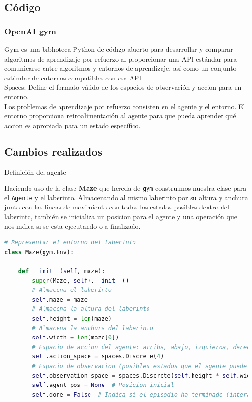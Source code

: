 \documentclass[a4paper,12pt]{article}
\begin{document}
\subsection{Código}

\subsubsection*{OpenAI gym}

Gym es una biblioteca Python de código abierto para desarrollar y comparar 
algoritmos de aprendizaje por refuerzo al proporcionar una API estándar 
para comunicarse entre algoritmos y entornos de aprendizaje, así como un 
conjunto estándar de entornos compatibles con esa API. \cite{docGym} \\

Spaces: Define el formato válido de los espacios de observación y accion para un entorno.\\

Los problemas de aprendizaje por refuerzo consisten en el agente y 
el entorno. El entorno proporciona retroalimentación al agente para 
que pueda aprender qué accion es apropiada para un estado específico.

\subsection{Cambios realizados}

\begin{center}
    \Large{Definición del agente}
\end{center}

\noindent Haciendo uso de la clase \textbf{Maze} que hereda de \texttt{gym} construimos 
nuestra clase para el \texttt{Agente} y el laberinto. Almacenando al mismo laberinto 
por su altura y anchura junto con las lineas de movimiento con todos los estados posibles 
dentro del laberinto, también se inicializa un posicion para el agente y una operación 
que nos indica si se esta ejecutando o a finalizado.

\begin{lstlisting}[style=mystylepython, language=Python, caption= Definición del agente]
# Representar el entorno del laberinto
class Maze(gym.Env):
    
    def __init__(self, maze):
        super(Maze, self).__init__()
        # Almacena el laberinto
        self.maze = maze  
        # Almacena la altura del laberinto
        self.height = len(maze)  
        # Almacena la anchura del laberinto
        self.width = len(maze[0])  
        # Espacio de accion del agente: arriba, abajo, izquierda, derecha
        self.action_space = spaces.Discrete(4)  
        # Espacio de observacion (posibles estados que el agente puede observar del entorno)
        self.observation_space = spaces.Discrete(self.height * self.width) 
        self.agent_pos = None  # Posicion inicial 
        self.done = False  # Indica si el episodio ha terminado (interacciones entre el agente y el entorno )
\end{lstlisting}
\end{document}
